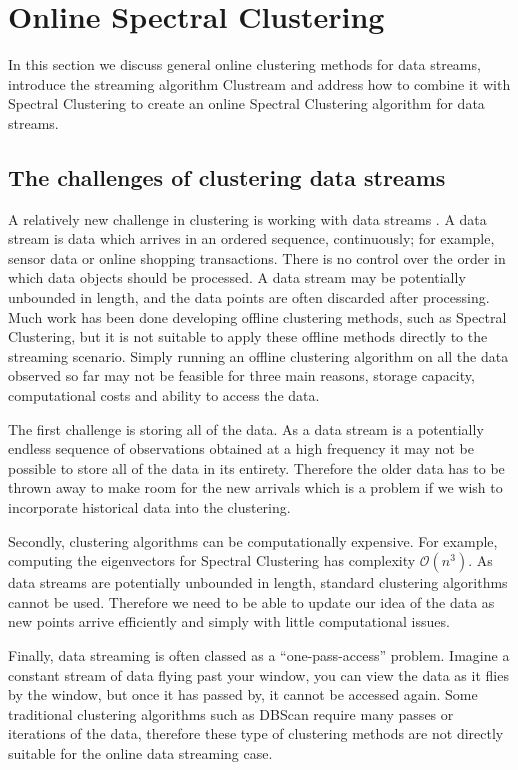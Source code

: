 \section{Online Spectral Clustering}
\label{sec:microSpec}

In this section we discuss general online clustering methods for data streams, introduce the streaming algorithm Clustream and address how to combine it with Spectral Clustering to create an online Spectral Clustering algorithm for data streams. 

\subsection{The challenges of clustering data streams}
A relatively new challenge in clustering is working with data streams \citep{Gama2010, Silva2013}. A data stream is data which arrives in an ordered sequence, continuously; for example, sensor data or online shopping transactions. There is no control over the order in which data objects should be processed. A data stream may be potentially unbounded in length, and the data points are often discarded after processing.  Much work has been done developing offline clustering methods, such as Spectral Clustering, but it is not suitable to apply these offline methods directly to the streaming scenario. Simply running an offline clustering algorithm on all the data observed so far may not be feasible for three main reasons, storage capacity, computational costs and ability to access the data.

The first challenge is storing all of the data. As a data stream is a potentially endless sequence of observations obtained at a high frequency it may not be possible to store all of the data in its entirety. Therefore the older data has to be thrown away to make room for the new arrivals which is a problem if we wish to incorporate historical data into the clustering.

Secondly, clustering algorithms can be computationally expensive. For example, computing the eigenvectors for Spectral Clustering has complexity $\mathcal{O}(n^3)$. As data streams are potentially unbounded in length, standard clustering algorithms cannot be used.  Therefore we need to be able to update our idea of the data as new points arrive efficiently and simply with little computational issues.

Finally, data streaming is often classed as a ``one-pass-access'' problem. Imagine a constant stream of data flying past your window, you can view the data as it flies by the window, but once it has passed by, it cannot be accessed again. Some traditional clustering algorithms such as DBScan \citep{Ester1996} require many passes or iterations of the data, therefore these type of clustering methods are not directly suitable for the online data streaming case.
 
